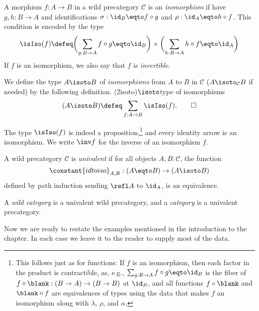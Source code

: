 \begin{definition}
  A morphism $f : A \to B$ in a wild precategory $\mathcal{C}$ is an
  \emph{isomorphism}
  if have $g, h : B \to A$ and identifications
  $\sigma : \id_B \eqto f\circ g$ and $\rho : \id_A \eqto h\circ f$.
  This condition is encoded by the type
  \[
    \isIso(f) \defeq \biggl(\sum_{g:B\to A}f\circ g\eqto\id_B\biggr)
    \times\biggl(\sum_{h:B\to A}h\circ f\eqto\id_A\biggr)
  \]
  If $f$ is an isomorphism, we also say that $f$ is \emph{invertible}.

  We define the type $A \isoto B$ of \emph{isomorphisms} from $A$ to $B$
  in $\mathcal C$ ($A \isoto_{\mathcal C} B$ if needed)
  by the following definition.%
  \glossary(2isoto){$\protect\isoto$}{type of isomorphisms}
  \[
    (A \isoto B) \defeq \sum_{f:A\to B} \isIso(f).\qedhere
  \]
\end{definition}
The type $\isIso(f)$
is indeed a proposition,\footnote{%
  This follows just as for functions: If $f$ is an isomorphism,
  then each factor in the product is contractible, as, e.g.,
  $\sum_{g:B\to A}f\circ g\eqto\id_B$ is the fiber
  of $f\circ\blank : (B \to A) \to (B \to B)$
  at $\id_B$, and all functions $f\circ\blank$ and $\blank\circ f$
  are equivalences of types using the data that makes $f$ an isomorphism
  along with $\lambda$, $\rho$, and $\alpha$.}
and every identity arrow is an isomorphism.
We write $\inv f$ for the inverse of an isomorphism $f$.
\begin{definition}
  A wild precategory $\mathcal C$ is \emph{univalent} if
  for all objects $A,B : \mathcal C$, the function
  \[
    \constant{idtoiso}_{A,B} : (A \eqto B) \to (A \isoto B)
  \]
  defined by path induction sending $\refl A$ to $\id_A$,
  is an equivalence.
\end{definition}
\begin{definition}
  A \emph{wild category} is a univalent wild precategory,
  and a \emph{category} is a univalent precategory.
\end{definition}
Now we are ready to restate the examples mentioned in the introduction to the chapter.
In each case we leave it to the reader to supply most of the data.

